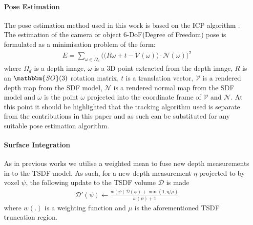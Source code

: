 \paragraph{Pose Estimation}
The pose estimation method used in this work is based on the ICP algorithm \cite{Besl1992}. The estimation of 
the camera or object 6-DoF(Degree of Freedom) pose is formulated as a minimisation problem of the form:
\begin{equation}
	\begin{split}
		E = \sum_{\omega \in \Omega_{d}} \bigg( \big( R\omega + t - \mathcal{V}(\bar{\omega}) \big) \cdot \mathcal{N}(\bar{\omega}) \bigg)^{2}
	\end{split}
\end{equation}
where $\Omega_{d}$ is a depth image, $\omega$ is a 3D point extracted from the depth image, $R$ is an  $\mathbbm{SO}(3)$ 
rotation matrix, $t$ is a translation vector, $\mathcal{V}$ is a rendered depth map from the SDF model, $\mathcal{N}$ is a rendered 
normal map from the SDF model and $\bar{\omega}$ is the point $\omega$ projected into the coordinate frame of $\mathcal{V}$ and 
$\mathcal{N}$. At this point it should be highlighted that the tracking algorithm used is separate from the contributions in this paper and 
as such can be substituted for any suitable pose estimation algorithm.

\paragraph{Surface Integration}
As in previous works \cite{Newcombe2011,Prisacariu2014} we utilise a weighted mean to fuse new depth measurements in to the TSDF model. As such, 
for a new depth measurement $\eta$ projected to by voxel $\psi$, the following update to the TSDF volume $\mathcal{D}$ is made
\begin{equation}
	\begin{split}
		\mathcal{D}'(\psi) \leftarrow \frac{w(\psi)\mathcal{D}(\psi) + \min(1, \eta/\mu)}{w(\psi) + 1}
	\end{split}
\end{equation}
where $w(.)$ is a weighting function and $\mu$ is the aforementioned TSDF truncation region.


